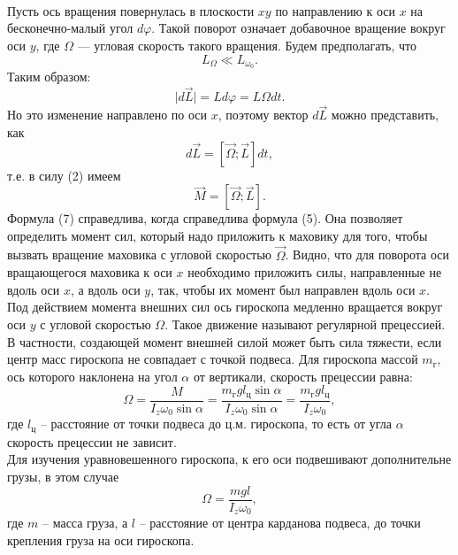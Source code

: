 \documentclass[a4paper, 12pt]{article}%
\begin{document}
\\
\\
\\
Пусть ось вращения повернулась в плоскости $xy$ по направлению к оси $x$ на бесконечно-малый угол $d\varphi$. Такой поворот означает добавочное вращение вокруг оси $y$, где $\Omega$ --- угловая скорость такого вращения. Будем предполагать, что 
\begin{equation}
L_{\Omega} \ll L_{\omega_0}.
\end{equation}
Таким образом: 
\begin{equation}
\mid d\vec{L}\mid=Ld\varphi=L\Omega dt.
\end{equation}
Но это изменение направлено по оси $x$, поэтому вектор $d\vec{L}$ можно представить, как
\[d\vec{L}=\left[ \vec{\Omega};\vec{L}\right] dt,\]
т.е. в силу (2) имеем
\begin{equation}
\vec{M}=\left[ \vec{\Omega};\vec{L}\right].
\end{equation}
Формула (7) справедлива, когда справедлива формула (5). Она позволяет определить момент сил, который надо приложить к маховику для того, чтобы вызвать вращение маховика с угловой скоростью $\vec{\Omega}$. Видно, что для поворота оси вращающегося маховика к оси $x$ необходимо приложить силы, направленные не вдоль оси $x$, а вдоль оси $y$, так, чтобы их момент был направлен вдоль оси $x$. \\
Под действием момента внешних сил ось гироскопа медленно вращается вокруг оси $y$ с угловой скоростью $\Omega$. Такое движение называют регулярной прецессией. В частности, создающей момент внешней силой может быть сила тяжести, если центр масс гироскопа не совпадает с точкой подвеса. Для гироскопа массой $m_{\text{г}}$, ось которого наклонена на угол $\alpha$ от вертикали, скорость прецессии равна:
\begin{equation}
\Omega=\dfrac{M}{I_z\omega_0\sin\alpha}=\dfrac{m_{\text{г}}gl_{\text{ц}}\sin\alpha}{I_z\omega_0\sin\alpha}=\dfrac{m_{\text{г}}gl_{\text{ц}}}{I_z\omega_0},
\end{equation}
где $l_{\text{ц}}$ -- расстояние от точки подвеса до ц.м. гироскопа, то есть от угла $\alpha$ скорость прецессии не зависит.\\
Для изучения уравновешенного гироскопа, к его оси подвешивают дополнительне грузы, в этом случае 
\begin{equation}
\Omega=\dfrac{mgl}{I_z\omega_0},
\end{equation}
где $m$ -- масса груза, а $l$ -- расстояние от центра карданова подвеса, до точки крепления груза на оси гироскопа.
\end{document}
